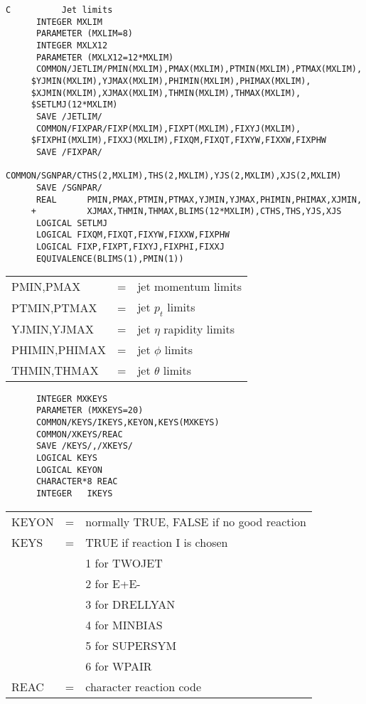 \begin{verbatim}
C          Jet limits
      INTEGER MXLIM
      PARAMETER (MXLIM=8)
      INTEGER MXLX12
      PARAMETER (MXLX12=12*MXLIM)
      COMMON/JETLIM/PMIN(MXLIM),PMAX(MXLIM),PTMIN(MXLIM),PTMAX(MXLIM),
     $YJMIN(MXLIM),YJMAX(MXLIM),PHIMIN(MXLIM),PHIMAX(MXLIM),
     $XJMIN(MXLIM),XJMAX(MXLIM),THMIN(MXLIM),THMAX(MXLIM),
     $SETLMJ(12*MXLIM)
      SAVE /JETLIM/
      COMMON/FIXPAR/FIXP(MXLIM),FIXPT(MXLIM),FIXYJ(MXLIM),
     $FIXPHI(MXLIM),FIXXJ(MXLIM),FIXQM,FIXQT,FIXYW,FIXXW,FIXPHW
      SAVE /FIXPAR/
      COMMON/SGNPAR/CTHS(2,MXLIM),THS(2,MXLIM),YJS(2,MXLIM),XJS(2,MXLIM)  
      SAVE /SGNPAR/
      REAL      PMIN,PMAX,PTMIN,PTMAX,YJMIN,YJMAX,PHIMIN,PHIMAX,XJMIN,
     +          XJMAX,THMIN,THMAX,BLIMS(12*MXLIM),CTHS,THS,YJS,XJS
      LOGICAL SETLMJ
      LOGICAL FIXQM,FIXQT,FIXYW,FIXXW,FIXPHW
      LOGICAL FIXP,FIXPT,FIXYJ,FIXPHI,FIXXJ
      EQUIVALENCE(BLIMS(1),PMIN(1))
\end{verbatim}
\begin{tabular}{lcl}
PMIN,PMAX          &=& jet momentum limits\\
PTMIN,PTMAX        &=& jet $p_t$ limits\\
YJMIN,YJMAX        &=& jet $\eta$ rapidity limits\\
PHIMIN,PHIMAX      &=& jet $\phi$ limits\\
THMIN,THMAX        &=& jet $\theta$ limits\\
\end{tabular}

\begin{verbatim}
      INTEGER MXKEYS
      PARAMETER (MXKEYS=20)
      COMMON/KEYS/IKEYS,KEYON,KEYS(MXKEYS)
      COMMON/XKEYS/REAC
      SAVE /KEYS/,/XKEYS/
      LOGICAL KEYS
      LOGICAL KEYON
      CHARACTER*8 REAC
      INTEGER   IKEYS
\end{verbatim}
\begin{tabular}{lcl}
KEYON              &=& normally TRUE, FALSE if no good reaction\\
KEYS               &=& TRUE if reaction I is chosen\\
                   && 1 for TWOJET\\
                   && 2 for E+E-\\
                   && 3 for DRELLYAN\\
                   && 4 for MINBIAS\\
                   && 5 for SUPERSYM\\
                   && 6 for WPAIR\\
REAC               &=& character reaction code\\
\end{tabular}


